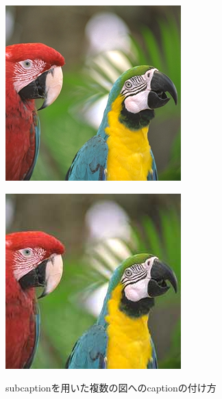 \documentclass[dvipdfmx,report,disablejfam,nosetpagesize,12pt]{jsbook}
\begin{document}
\begin{figure}[tp]
   \centering
   \begin{minipage}[c]{.45\hsize}
      \centering
      \includegraphics[width=.6\hsize]{figure/example-png.png}
      \label{Fig.example-subcaption.a}
   \end{minipage}
   \begin{minipage}[c]{.45\hsize}
      \centering
      \includegraphics[width=.6\hsize]{figure/example-jpg.jpg}
      \label{Fig.example-subcaption.b}
   \end{minipage}
   \caption{subcaptionを用いた複数の図へのcaptionの付け方}
   \label{Fig.example-subcaption}
\end{figure}
\end{document}
